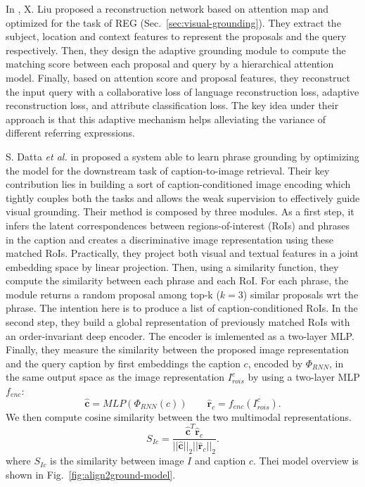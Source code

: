 In \cite{liu2019adaptive}, X. Liu \etal{} proposed a reconstruction
network based on attention map and optimized for the task of REG
(Sec.~\ref{sec:visual-grounding}). They extract the subject, location
and context features to represent the proposals and the query
respectively. Then, they design the adaptive grounding module to
compute the matching score between each proposal and query by a
hierarchical attention model. Finally, based on attention score and
proposal features, they reconstruct the input query with a
collaborative loss of language reconstruction loss, adaptive
reconstruction loss, and attribute classification loss. The key idea
under their approach is that this adaptive mechanism helps alleviating
the variance of different referring expressions.


S. Datta \textit{et al.} in \cite{datta2019align2ground} proposed a
system able to learn phrase grounding by optimizing the model for the
downstream task of caption-to-image retrieval. Their key contribution
lies in building a sort of caption-conditioned image encoding which
tightly couples both the tasks and allows the weak supervision to
effectively guide visual grounding. Their method is composed by three
modules. As a first step, it infers the latent correspondences between
regions-of-interest (RoIs) and phrases in the caption and creates a
discriminative image representation using these matched RoIs.
Practically, they project both visual and textual features in a joint
embedding space by linear projection. Then, using a similarity
function, they compute the similarity between each phrase and each
RoI. For each phrase, the module returns a random proposal among top-k
($k = 3$) similar proposals wrt the phrase. The intention here is to produce a list of caption-conditioned RoIs. In the second step, they build a global representation of previously matched RoIs with an order-invariant deep encoder. The encoder is imlemented as a two-layer MLP. Finally, they measure the similarity between the proposed image representation and the
query caption by first embeddings the caption $c$, encoded
by $\Phi_{RNN}$, in the same output space as the image representation  $I^c_{rois}$ by using a two-layer MLP $f_{enc}$:
\begin{equation}
    \hat{\bm{c}} = MLP (\Phi_{RNN} (c)) \qquad \hat{\bm{r}}_c = f_{enc} (I^c_{rois}).
\end{equation}
We then compute cosine
similarity between the two multimodal representations.
\begin{equation}
    S_{Ic} = \frac{ \hat{\bm{c}}^T \hat{\bm{r}}_c }{ || \hat{\bm{c}} ||_2 || \hat{\bm{r}}_c ||_2 }.
\end{equation}
where $S_{Ic}$ is the similarity between image $I$ and caption $c$. Thei model overview is shown in Fig.~\ref{fig:align2ground-model}.

